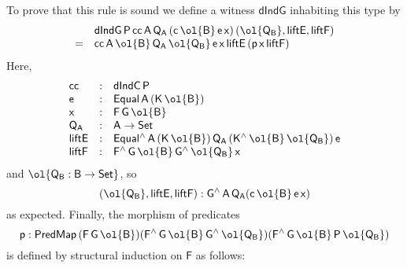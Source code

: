 \documentclass[sigplan,screen]{acmart}
\begin{document}
To prove that this rule is sound we define a witness
$\mathsf{dIndG}$ inhabiting this type by
\[\begin{array}{ll}
 & \mathsf{dIndG\,P\,cc\,A\,Q_A\,(c\,\ol{B}\,e\,x)\,(\ol{Q_B}, liftE, liftF)}\\
= & \mathsf{cc\,A\,\ol{B}\,Q_A\,\ol{Q_B}\,e\,x\,liftE\,(p\,x\,liftF)}
\end{array}\]
Here,
\[\begin{array}{lll}
\mathsf{cc} & : & \mathsf{dIndC\,P}\\
\mathsf{e} & : & \mathsf{Equal\,A\,(K\,\ol{B})}\\
\mathsf{x} & : & \mathsf{F\,G\,\ol{B}}\\
\mathsf{Q_A} & : & \mathsf{A \to Set}\\
\mathsf{liftE} & : & \mathsf{Equal^{\wedge}\,A\,(K\,\ol{B})\,Q_A\,
  (K^{\wedge}\,\ol{B}\,\ol{Q_B})\,e}\\
\mathsf{liftF} & : &
\mathsf{F^{\wedge}\,G\,\ol{B}\,G^{\wedge}\,{\ol{Q_B}}\,x}
\end{array}\]
and $\ol{\mathsf{Q_B : B \to Set}}$,
so
\[\mathsf{(\ol{Q_B}, liftE, liftF) : G^{\wedge}\,A\,Q_A (c\,\ol{B}\,
  e\,x)}\] as expected.  Finally, the morphism of predicates
\[\mathsf{p : PredMap\,(F\,G\,\ol{B})
  (F^{\wedge}\,G\,\ol{B}\,G^{\wedge}\,\ol{Q_B}) 
  (F^{\wedge}\,G\,\ol{B}\,P\,\ol{Q_B})}\] is defined by structural
induction on $\mathsf{F}$ as follows:
\end{document}
